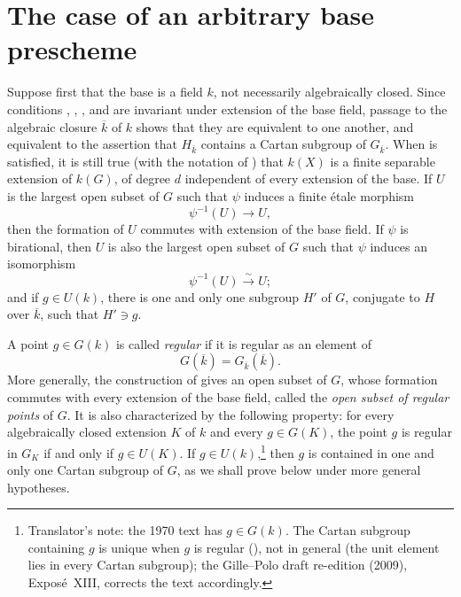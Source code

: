 
\makeatletter
{}
\makeatother

\section{The case of an arbitrary base prescheme}

Suppose first that the base is a field \(k\), not necessarily
algebraically closed. Since conditions  , , ,
and  are invariant under extension of the base field, passage to
the algebraic closure \(\overline{k}\) of \(k\) shows that they are
equivalent to one another, and equivalent to the assertion that
\(H_{\overline{k}}\) contains a Cartan subgroup of
\(G_{\overline{k}}\). When  is satisfied, it is still
true (with the notation of ) that \(k(X)\) is a finite separable
extension of \(k(G)\), of degree \(d\) independent of every extension
of the base. If \(U\) is the largest open subset of \(G\) such that
\(\psi\) induces a finite étale morphism
\[
  \psi^{-1}(U)\longrightarrow U,
\]
then the formation of \(U\) commutes with extension of the base field.
If \(\psi\) is birational, then \(U\) is also the largest open subset
of \(G\) such that \(\psi\) induces an isomorphism
\[
  \psi^{-1}(U)\xrightarrow{\sim}U;
\]
and if \(g\in U(k)\), there is one and only one subgroup \(H'\) of
\(G\), conjugate to \(H\) over \(\overline{k}\), such that
\(H'\ni g\).

A point \(g\in G(k)\) is called \emph{regular} if it is regular as an
element of
\[
  G(\overline{k})=G_{\overline{k}}(\overline{k}).
\]
More generally, the construction of  gives an open subset of \(G\),
whose formation commutes with every extension of the base field,
called the \emph{open subset of regular points} of \(G\). It is also
characterized by the following property: for every algebraically
closed extension \(K\) of \(k\) and every \(g\in G(K)\), the point
\(g\) is regular in \(G_K\) if and only if \(g\in U(K)\). If
\(g\in U(k)\),\footnote{Translator's note: the 1970 text has
\(g\in G(k)\). The Cartan subgroup containing \(g\) is unique when \(g\) is
regular (), not in general (the
unit element lies in every Cartan subgroup); the Gille--Polo draft
re-edition (2009), Exposé~XIII, corrects the text accordingly.} then \(g\) is contained in one and only one Cartan
subgroup of \(G\), as we shall prove below under more general
hypotheses.

